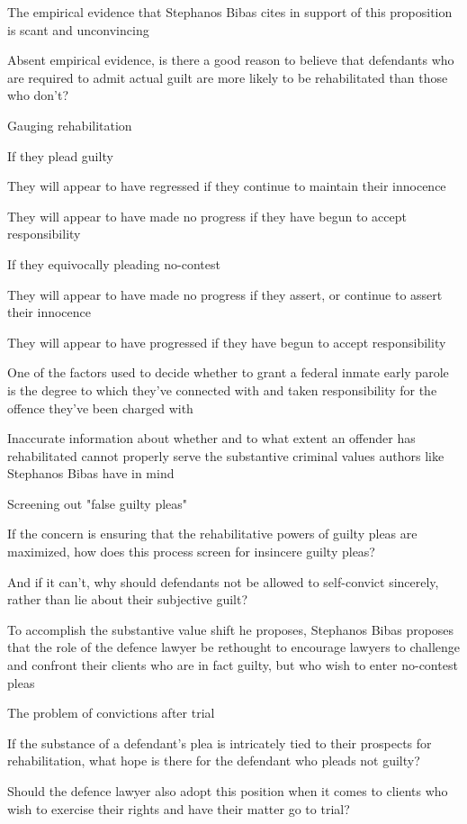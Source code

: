 The empirical evidence that Stephanos Bibas cites in support of this proposition is scant and unconvincing

Absent empirical evidence, is there a good reason to believe that defendants who are required to admit actual guilt are more likely to be rehabilitated than those who don't?

Gauging rehabilitation

If they plead guilty

They will appear to have regressed if they continue to maintain their innocence

They will appear to have made no progress if they have begun to accept responsibility

If they equivocally pleading no-contest

They will appear to have made no progress if they assert, or continue to assert their innocence

They will appear to have progressed if they have begun to accept responsibility

One of the factors used to decide whether to grant a federal inmate early parole is the degree to which they've connected with and taken responsibility for the offence they've been charged with

Inaccurate information about whether and to what extent an offender has rehabilitated cannot properly serve the substantive criminal values authors like Stephanos Bibas have in mind

Screening out "false guilty pleas"

If the concern is ensuring that the rehabilitative powers of guilty pleas are maximized, how does this process screen for insincere guilty pleas?

And if it can't, why should defendants not be allowed to self-convict sincerely, rather than lie about their subjective guilt?

To accomplish the substantive value shift he proposes, Stephanos Bibas proposes that the role of the defence lawyer be rethought to encourage lawyers to challenge and confront their clients who are in fact guilty, but who wish to enter no-contest pleas

The problem of convictions after trial

If the substance of a defendant's plea is intricately tied to their prospects for rehabilitation, what hope is there for the defendant who pleads not guilty?

Should the defence lawyer also adopt this position when it comes to clients who wish to exercise their rights and have their matter go to trial?


